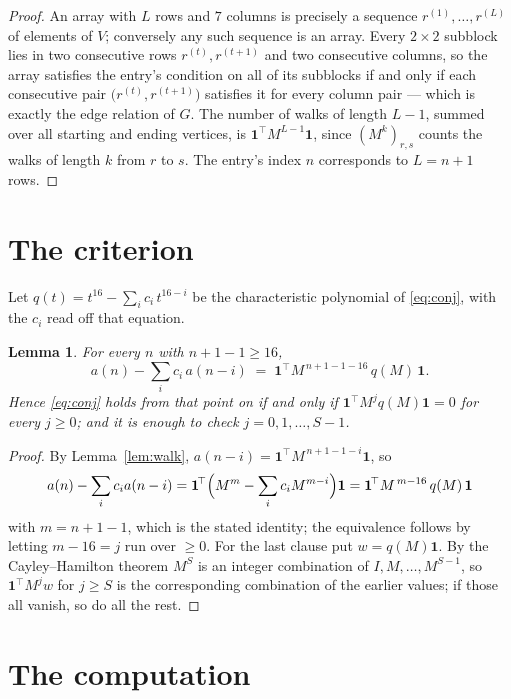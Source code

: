 \documentclass[11pt,a4paper]{article}
\theoremstyle{plain}
\newtheorem{lemma}[theorem]{Lemma}
\theoremstyle{definition}
\begin{document}
\begin{proof}
An array with $L$ rows and $7$ columns is precisely a sequence
$r^{(1)},\dots,r^{(L)}$ of elements of $V$; conversely any such sequence is an array.
Every $2\times2$ subblock lies in two consecutive rows $r^{(t)},r^{(t+1)}$ and two
consecutive columns, so the array satisfies the entry's condition on all of its subblocks
if and only if each consecutive pair $\bigl(r^{(t)},r^{(t+1)}\bigr)$ satisfies it for
every column pair --- which is exactly the edge relation of $G$. The number of walks of
length $L-1$, summed over all starting and ending vertices, is
$\mathbf{1}^{\!\top}M^{L-1}\mathbf{1}$, since $(M^{k})_{r,s}$ counts the walks of
length $k$ from $r$ to $s$. The entry's index $n$ corresponds to $L=n+1$ rows.
\end{proof}

\section{The criterion}

Let $q(t)=t^{16}-\sum_i c_i\,t^{16-i}$ be the characteristic polynomial of
\eqref{eq:conj}, with the $c_i$ read off that equation.

\begin{lemma}\label{lem:crit}
For every $n$ with $n+1-1\ge16$,
\[
a(n)-\sum_i c_i\,a(n-i)\;=\;\mathbf{1}^{\!\top}M^{\,n+1-1-16}\,q(M)\,\mathbf{1} .
\]
Hence \eqref{eq:conj} holds from that point on if and only if
$\mathbf{1}^{\!\top}M^{j}q(M)\mathbf{1}=0$ for every $j\ge0$; and it is enough to check
$j=0,1,\dots,S-1$.
\end{lemma}

\begin{proof}
By Lemma~\ref{lem:walk}, $a(n-i)=\mathbf{1}^{\!\top}M^{\,n+1-1-i}\mathbf{1}$, so
\[
a(n)-\sum_i c_i a(n-i)
=\mathbf{1}^{\!\top}\Bigl(M^{m}-\sum_i c_i M^{m-i}\Bigr)\mathbf{1}
=\mathbf{1}^{\!\top}M^{\,m-16}\,q(M)\,\mathbf{1}
\]
with $m=n+1-1$, which is the stated identity; the equivalence follows by letting
$m-16=j$ run over $\ge0$. For the last clause put $w=q(M)\mathbf{1}$. By the
Cayley--Hamilton theorem $M^{S}$ is an integer combination of $I,M,\dots,M^{S-1}$, so
$\mathbf{1}^{\!\top}M^{j}w$ for $j\ge S$ is the corresponding combination of the earlier
values; if those all vanish, so do all the rest.
\end{proof}

\section{The computation}
\end{document}

